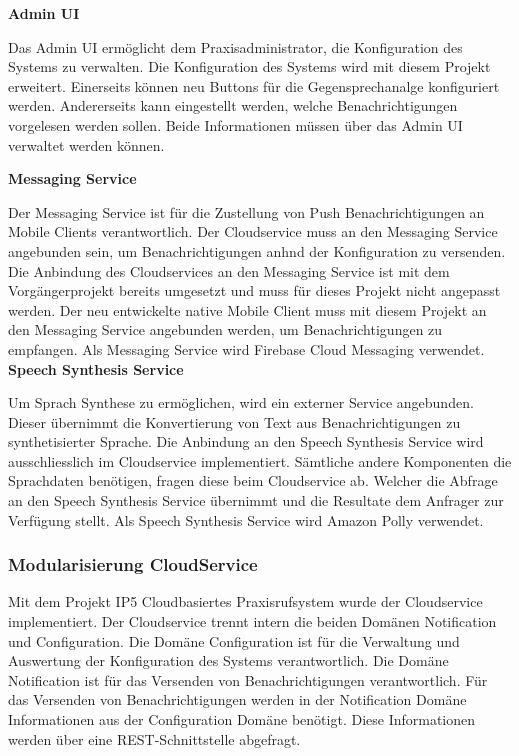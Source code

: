 \textbf{Admin UI}

Das Admin UI ermöglicht dem Praxisadministrator, die Konfiguration des Systems zu verwalten.
Die Konfiguration des Systems wird mit diesem Projekt erweitert.
Einerseits können neu Buttons für die Gegensprechanalge konfiguriert werden.
Andererseits kann eingestellt werden, welche Benachrichtigungen vorgelesen werden sollen.
Beide Informationen müssen über das Admin UI verwaltet werden können.

\textbf{Messaging Service}

Der Messaging Service ist für die Zustellung von Push Benachrichtigungen an Mobile Clients verantwortlich.
Der Cloudservice muss an den Messaging Service angebunden sein, um Benachrichtigungen anhnd der Konfiguration zu versenden.
Die Anbindung des Cloudservices an den Messaging Service ist mit dem Vorgängerprojekt bereits umgesetzt und muss für dieses Projekt nicht angepasst werden.
Der neu entwickelte native Mobile Client muss mit diesem Projekt an den Messaging Service angebunden werden, um Benachrichtigungen zu empfangen.
Als Messaging Service wird Firebase Cloud Messaging verwendet.\\

\textbf{Speech Synthesis Service}

Um Sprach Synthese zu ermöglichen, wird ein externer Service angebunden.
Dieser übernimmt die Konvertierung von Text aus Benachrichtigungen zu synthetisierter Sprache.
Die Anbindung an den Speech Synthesis Service wird ausschliesslich im Cloudservice implementiert.
Sämtliche andere Komponenten die Sprachdaten benötigen, fragen diese beim Cloudservice ab.
Welcher die Abfrage an den Speech Synthesis Service übernimmt und die Resultate dem Anfrager zur Verfügung stellt.
Als Speech Synthesis Service wird Amazon Polly verwendet.

\clearpage

\subsubsection{Modularisierung CloudService}

Mit dem Projekt IP5 Cloudbasiertes Praxisrufsystem wurde der Cloudservice implementiert.
Der Cloudservice trennt intern die beiden Domänen Notification und Configuration.
Die Domäne Configuration ist für die Verwaltung und Auswertung der Konfiguration des Systems verantwortlich.
Die Domäne Notification ist für das Versenden von Benachrichtigungen verantwortlich.
Für das Versenden von Benachrichtigungen werden in der Notification Domäne Informationen aus der Configuration Domäne benötigt.
Diese Informationen werden über eine REST-Schnittstelle abgefragt.


